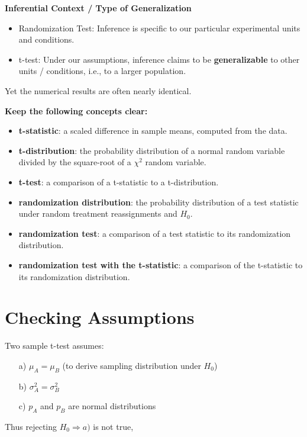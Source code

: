 \documentclass[14pt]{extarticle}
\begin{document}
\textbf{Inferential Context / Type of Generalization}

\begin{itemize}
    \item Randomization Test: Inference is specific to our particular experimental units and conditions.
    \item t-test: Under our assumptions, inference claims to be \textbf{generalizable }to other units / conditions, i.e., to a larger population.
\end{itemize}

Yet the numerical results are often nearly identical.

\newpage

\textbf{Keep the following concepts clear:}

\begin{itemize}
    \item \textbf{t-statistic}: a scaled difference in sample means, computed from the data.
    
    \item \textbf{t-distribution}: the probability distribution of a normal random variable divided by the square-root of a $\chi^2$ random variable.
    
    \item \textbf{t-test}: a comparison of a t-statistic to a t-distribution.
    
    \item \textbf{randomization distribution}: the probability distribution of a test statistic under random treatment reassignments and $H_0$.
    
    \item \textbf{randomization test}: a comparison of a test statistic to its randomization distribution.
    
    \item \textbf{randomization test with the t-statistic}: a comparison of the t-statistic to its randomization distribution.
\end{itemize}

\section*{Checking Assumptions}
Two sample t-test assumes:
\begin{itemize}
    \item[a)] $\mu_A = \mu_B$ (to derive sampling distribution under $H_0$)
    \item[b)] $\sigma^2_A = \sigma^2_B$
    \item[c)] $p_A$ and $p_B$ are normal distributions
\end{itemize}
Thus rejecting $H_0 \Rightarrow a)$ is not true,
\end{document}
